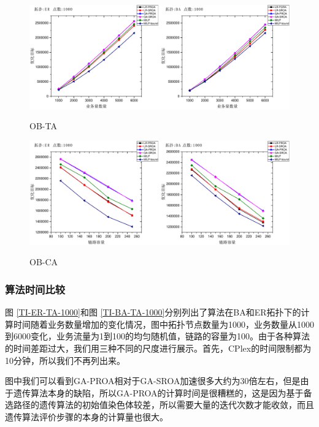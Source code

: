  \begin{figure}
\setlength{\belowcaptionskip}{-0.1cm}
  \begin{center}
    {\includegraphics[width=1  \textwidth]{figures/OB-TA.pdf}}
    \end{center}
  \caption{{\footnotesize{OB-TA}}}
  \label{OB-TA}
\end{figure}
  \begin{figure}
\setlength{\belowcaptionskip}{-0.1cm}
  \begin{center}
    {\includegraphics[width=1 \textwidth]{figures/OB-CA.pdf}}
    \end{center}
  \caption{{\footnotesize{OB-CA}}}
  \label{OB-CA}
\end{figure}
\subsubsection{算法时间比较}
  图 \ref{TI-ER-TA-1000}和图 \ref{TI-BA-TA-1000}分别列出了算法在BA和ER拓扑下的计算时间随着业务数量增加的变化情况，图中拓扑节点数量为1000，业务数量从1000 到6000变化，业务流量为1到100的均匀随机值，链路的容量为100。由于各种算法的时间差距过大，我们用三种不同的尺度进行展示。首先，CPlex的时间限制都为10分钟，所以我们不再列出来。

  图中我们可以看到GA-PROA相对于GA-SROA加速很多大约为30倍左右，但是由于遗传算法本身的缺陷，所以GA-PROA的计算时间是很糟糕的，这是因为基于备选路径的遗传算法的初始值染色体较差，所以需要大量的迭代次数才能收敛，而且遗传算法评价步骤的本身的计算量也很大。

